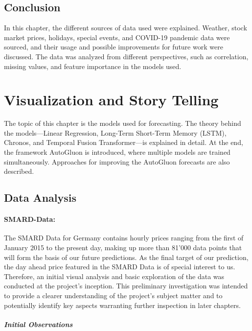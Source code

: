 \documentclass[a4paper]{article}
\begin{document}
    \subsection{Conclusion}\label{conclusion}

In this chapter, the different sources of data used were explained.
Weather, stock market prices, holidays, special events, and COVID-19
pandemic data were sourced, and their usage and possible improvements
for future work were discussed. The data was analyzed from different
perspectives, such as correlation, missing values, and feature
importance in the models used.

    \section{Visualization and Story
Telling}\label{visualization-and-story-telling}

    The topic of this chapter is the models used for forecasting. The theory
behind the models---Linear Regression, Long-Term Short-Term Memory
(LSTM), Chronos, and Temporal Fusion Transformer---is explained in
detail. At the end, the framework AutoGluon is introduced, where
multiple models are trained simultaneously. Approaches for improving the
AutoGluon forecasts are also described.

    \subsection{Data Analysis}\label{data-analysis}

\paragraph{SMARD-Data:}\label{smard-data}

The SMARD Data for Germany contains hourly prices ranging from the first
of January 2015 to the present day, making up more than 81'000 data
points that will form the basis of our future predictions. As the final
target of our prediction, the day ahead price featured in the SMARD Data
is of special interest to us. Therefore, an initial visual analysis and
basic exploration of the data was conducted at the project's inception.
This preliminary investigation was intended to provide a clearer
understanding of the project's subject matter and to potentially
identify key aspects warranting further inspection in later chapters.

\subparagraph{Initial Observations}\label{initial-observations}
\end{document}
